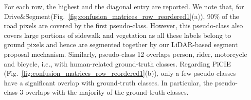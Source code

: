 \documentclass[runningheads]{llncs}
\newcommand{\ours}{Drive$\&$Segment\xspace}
\begin{document}
For each row, the highest and the diagonal entry are reported. We note that, for \ours (Fig.~\ref{fig:confusion_matrices_row_reordered1}(a)), 90\% of the road pixels are covered by the first pseudo-class. However, this pseudo-class also covers large portions of sidewalk and vegetation as all these labels belong to ground pixels and hence are segmented together by our LiDAR-based segment proposal mechanism. Similarly, pseudo-class 12 overlaps person, rider, motorcycle and bicycle, i.e., with human-related ground-truth classes. Regarding PiCIE (Fig.~\ref{fig:confusion_matrices_row_reordered1}(b)), only a few pseudo-classes 
have a significant overlap with ground-truth classes. In particular, the pseudo-class 3
overlaps with the majority of the ground-truth classes. 

\setlength{\fboxsep}{3mm} \renewcommand{\tabcolsep}{-2.pt}
\end{document}
